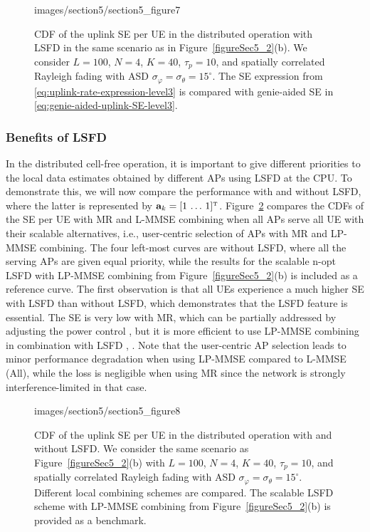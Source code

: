 \begin{figure}[t!]\centering
	\begin{overpic}[width=0.88\columnwidth,tics=10]{images/section5/section5_figure7}
	\end{overpic} 
	\caption{CDF of the uplink SE per UE in the distributed operation with LSFD in the same scenario as in Figure~\ref{figureSec5_2}(b). We consider $L=100$, $N=4$, $K=40$, $\tau_p=10$, and spatially correlated Rayleigh  fading with ASD $\sigma_{\varphi}=\sigma_{\theta}=15^{\circ}$. The SE expression from \eqref{eq:uplink-rate-expression-level3} is compared with genie-aided SE in \eqref{eq:genie-aided-uplink-SE-level3}.}    \vspace{+2mm}
	\label{figureSec5_2x} 
\end{figure}


\subsubsection{Benefits of LSFD}

In the distributed cell-free operation, it is important to give different priorities to the local data estimates obtained by different APs using LSFD at the CPU. To demonstrate this, we will now compare the performance with and without LSFD, where the latter is represented by $\vect{a}_k = [1 \, \ldots \, 1]^{\Ttran}$.
Figure~\ref{figureSec5_3} compares the CDFs of the SE per UE with MR and L-MMSE combining when all APs serve all UE with their scalable alternatives, i.e., user-centric selection of APs with MR and LP-MMSE combining. The four left-most curves are without LSFD, where all the serving APs are given equal priority, while the results for the scalable n-opt LSFD with LP-MMSE combining from Figure~\ref{figureSec5_2}(b) is included as a reference curve. The first observation is that all UEs experience a much higher SE with LSFD than without LSFD, which demonstrates that the LSFD feature is essential.
The SE is very low with MR, which can be partially addressed by adjusting the power control \cite{Ngo2017b}, but it is more efficient to use LP-MMSE combining in combination with LSFD \cite{Bjornson2019c}, \cite{Bjornson2020a}. Note that the user-centric AP selection leads to minor performance degradation when using LP-MMSE compared to L-MMSE (All), while the loss is negligible when using MR since the network is strongly interference-limited in that case.


\begin{figure}[t!]\centering
	\begin{overpic}[width=0.88\columnwidth,tics=10]{images/section5/section5_figure8}
	\end{overpic} 
	\caption{CDF of the uplink SE per UE in the distributed operation with and without LSFD. We consider the same scenario as Figure~\ref{figureSec5_2}(b) with $L=100$, $N=4$, $K=40$, $\tau_p=10$, and spatially correlated Rayleigh  fading with ASD $\sigma_{\varphi}=\sigma_{\theta}=15^{\circ}$. Different local combining schemes are compared. The scalable LSFD scheme with LP-MMSE combining from Figure~\ref{figureSec5_2}(b) is provided as a benchmark.}    \vspace{+2mm}
	\label{figureSec5_3} 
\end{figure}


